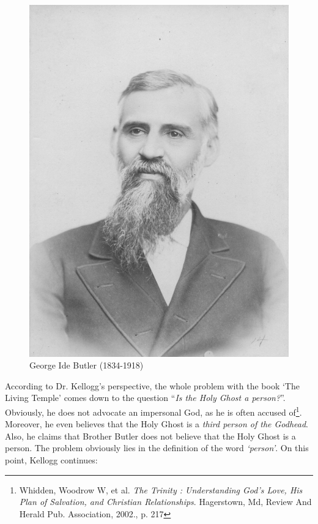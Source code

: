 \begin{figure}[hp]
    \centering
    \includegraphics[width=1\linewidth]{images/george-ide-butler.jpg}
    \caption*{George Ide Butler (1834-1918)}
    \label{fig:g-i-butler}
\end{figure}

According to Dr. Kellogg’s perspective, the whole problem with the book ‘The Living Temple’ comes down to the question “\textit{Is the Holy Ghost a person?}”. Obviously, he does not advocate an impersonal God, as he is often accused of\footnote{Whidden, Woodrow W, et al. \textit{The Trinity : Understanding God's Love, His Plan of Salvation, and Christian Relationships}. Hagerstown, Md, Review And Herald Pub. Association, 2002., p. 217}. Moreover, he even believes that the Holy Ghost is a \textit{third person of the Godhead}. Also, he claims that Brother Butler does not believe that the Holy Ghost is a person. The problem obviously lies in the definition of the word \textit{‘person’}. On this point, Kellogg continues:

